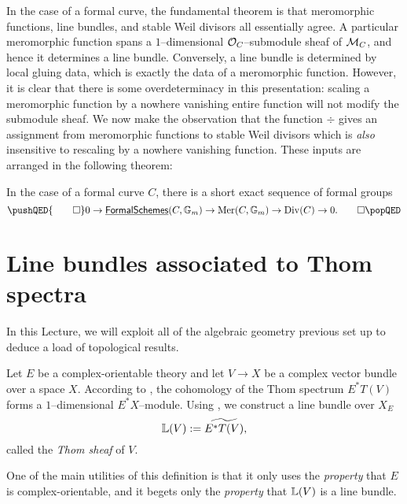 In the case of a formal curve, the fundamental theorem is that meromorphic functions, line bundles, and stable Weil divisors all essentially agree.  A particular meromorphic function spans a $1$--dimensional $\mathcal{O}_C$--submodule sheaf of $\mathcal{M}_C$, and hence it determines a line bundle.  Conversely, a line bundle is determined by local gluing data, which is exactly the data of a meromorphic function.  However, it is clear that there is some overdeterminacy in this presentation: scaling a meromorphic function by a nowhere vanishing entire function will not modify the submodule sheaf.  We now make the observation that the function $\div$ gives an assignment from meromorphic functions to stable Weil divisors which is \emph{also} insensitive to rescaling by a nowhere vanishing function.  These inputs are arranged in the following theorem:

\begin{theorem}
In the case of a formal curve $C$, there is a short exact sequence of formal groups
\[\pushQED{\qed}
0 \to \InternalHom{FormalSchemes}(C, \mathbb G_m) \to \operatorname{Mer}(C, \mathbb G_m) \to \Div(C) \to 0. \qedhere
\popQED\]
\end{theorem}











\section{Line bundles associated to Thom spectra}\label{ProjectivizationLecture}

In this Lecture, we will exploit all of the algebraic geometry previous set up to deduce a load of topological results.

\begin{definition}\label{DefnThomSheaf}
Let $E$ be a complex-orientable theory and let $V \to X$ be a complex vector bundle over a space $X$.  According to , the cohomology of the Thom spectrum $E^* T(V)$ forms a $1$--dimensional $E^* X$--module.  Using , we construct a line bundle over $X_E$ \[\mathbb{L}(V) := \widetilde{E^* T(V)},\] called the \textit{Thom sheaf} of $V$.
\end{definition}

\begin{remark}
One of the main utilities of this definition is that it only uses the \emph{property} that $E$ is complex-orientable, and it begets only the \emph{property} that $\mathbb{L}(V)$ is a line bundle.
\end{remark}

